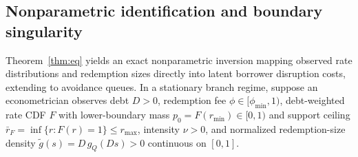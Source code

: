 \subsection{Nonparametric identification and boundary singularity}\label{subsec:gpv}

Theorem~\ref{thm:eq} yields an exact nonparametric inversion mapping observed rate distributions and redemption sizes directly into latent borrower disruption costs, extending \citet{guerre2000optimal} to avoidance queues. In a stationary branch regime, suppose an econometrician observes debt $D > 0$, redemption fee $\phi \in [\phi_{\min}, 1)$, debt-weighted rate CDF $F$ with lower-boundary mass $p_0 = F(r_{\min}) \in [0, 1)$ and support ceiling $\bar{r}_F = \inf\{r : F(r) = 1\} \le r_{\max}$, intensity $\nu > 0$, and normalized redemption-size density $\tilde{g}(s) = D\,g_Q(Ds) > 0$ continuous on $[0, 1]$.

